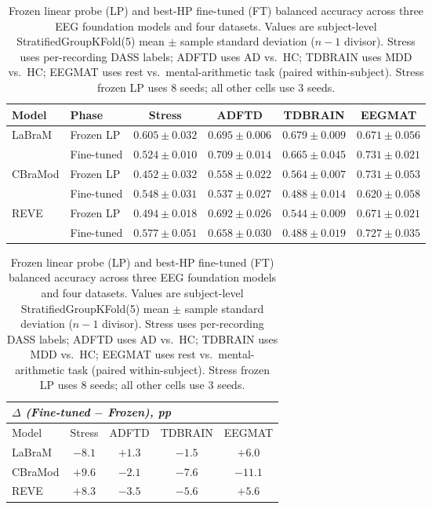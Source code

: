 
\begin{table}[t]
\centering
\caption{%
  Frozen linear probe (LP) and best-HP fine-tuned (FT) balanced accuracy
  across three EEG foundation models and four datasets. Values are
  subject-level StratifiedGroupKFold(5) mean $\pm$ sample standard
  deviation ($n-1$ divisor). Stress uses per-recording DASS labels;
  ADFTD uses AD vs.\ HC; TDBRAIN uses MDD vs.\ HC; EEGMAT uses rest vs.\
  mental-arithmetic task (paired within-subject). Stress frozen LP uses
  8 seeds; all other cells use 3 seeds.%
}
\label{tab:master}
\small
\setlength{\tabcolsep}{6pt}
\renewcommand{\arraystretch}{1.15}
\begin{tabular}{l l c c c c}
\toprule
Model & Phase & Stress & ADFTD & TDBRAIN & EEGMAT \\
\midrule
\multirow{2}{*}{LaBraM}
  & Frozen LP  & $0.605 \pm 0.032$ & $0.695 \pm 0.006$ & $0.679 \pm 0.009$ & $0.671 \pm 0.056$ \\
  & Fine-tuned & $0.524 \pm 0.010$ & $0.709 \pm 0.014$ & $0.665 \pm 0.045$ & $0.731 \pm 0.021$ \\
\midrule
\multirow{2}{*}{CBraMod}
  & Frozen LP  & $0.452 \pm 0.032$ & $0.558 \pm 0.022$ & $0.564 \pm 0.007$ & $\mathbf{0.731 \pm 0.053}$ \\
  & Fine-tuned & $0.548 \pm 0.031$ & $0.537 \pm 0.027$ & $0.488 \pm 0.014$ & $0.620 \pm 0.058$ \\
\midrule
\multirow{2}{*}{REVE}
  & Frozen LP  & $0.494 \pm 0.018$ & $0.692 \pm 0.026$ & $0.544 \pm 0.009$ & $0.671 \pm 0.021$ \\
  & Fine-tuned & $0.577 \pm 0.051$ & $0.658 \pm 0.030$ & $0.488 \pm 0.019$ & $0.727 \pm 0.035$ \\
\bottomrule
\end{tabular}

\vspace{0.6em}
\begin{tabular}{l c c c c}
\multicolumn{5}{l}{\textit{$\Delta$ (Fine-tuned $-$ Frozen), pp}} \\
\toprule
Model & Stress & ADFTD & TDBRAIN & EEGMAT \\
\midrule
LaBraM   & $\mathbf{-8.1}$ & $+1.3$ & $-1.5$ & $\mathbf{+6.0}$ \\
CBraMod  & $\mathbf{+9.6}$ & $-2.1$ & $-7.6$ & $\mathbf{-11.1}$ \\
REVE     & $\mathbf{+8.3}$ & $-3.5$ & $-5.6$ & $+5.6$ \\
\bottomrule
\end{tabular}
\end{table}
